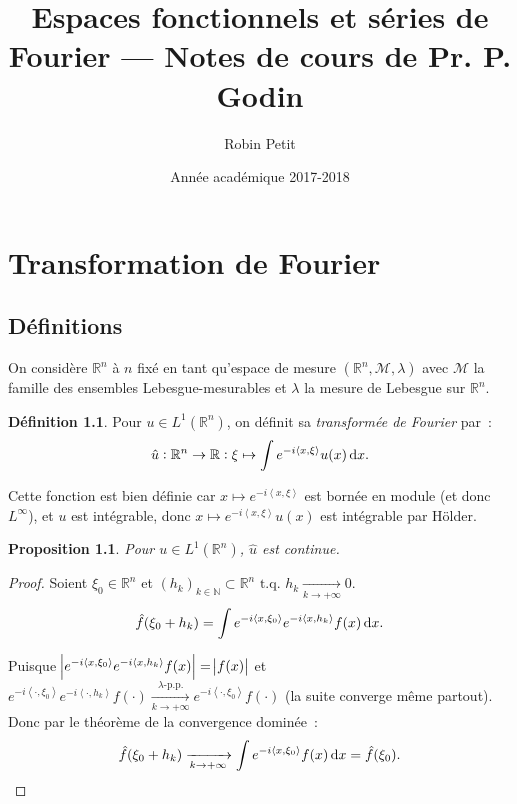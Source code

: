 \documentclass{report}
\title{Espaces fonctionnels et séries de Fourier --- Notes de cours de Pr. P. Godin}
\author{Robin Petit}
\date{Année académique 2017-2018}
\newcommand{\R}{{\mathbb R}}
\newcommand{\N}{{\mathbb N}}
\newcommand{\scpr}[2]{\left\langle#1, #2\right\rangle}
\newcommand{\tq}{\text{ t.q. }}
\newcommand{\pinfty}{{+\infty}}
\newtheorem{prp}[thm]{Proposition}
\theoremstyle{definition}
\newtheorem{déf}[thm]{Définition}
\theoremstyle{remark}
\begin{document}
\maketitle
\tableofcontents
\setcounter{page}{1}

\chapter{Transformation de Fourier}

\section{Définitions}

On considère $\R^n$ à $n$ fixé en tant qu'espace de mesure $(\R^n, \mathcal M, \lambda)$ avec $\mathcal M$ la famille des ensembles Lebesgue-mesurables et $\lambda$
la mesure de Lebesgue sur $\R^n$.

\begin{déf}\label{déf:Fourier dans L^1} Pour $u \in L^1(\R^n)$, on définit sa \textit{transformée de Fourier} par~:
\begin{equation}
	\hat u : \R^n \to \R : \xi \mapsto \int e^{-i\scpr x\xi}u(x)\dif x.
\end{equation}
\end{déf}

Cette fonction est bien définie car $x \mapsto e^{-i\scpr x\xi}$ est bornée en module (et donc $L^\infty$), et $u$ est intégrable, donc $x \mapsto e^{-i\scpr x\xi}u(x)$ est intégrable
par Hölder.

\begin{prp} Pour $u \in L^1(\R^n)$, $\hat u$ est continue.
\end{prp}

\begin{proof} Soient $\xi_0 \in \R^n$ et $(h_k)_{k \in \N} \subset \R^n \tq h_k \xrightarrow[k \to \pinfty]{} 0$.
\[\hat f(\xi_0 + h_k) = \int e^{-i\scpr x{\xi_0}}e^{-i\scpr x{h_k}}f(x)\dif x.\]

Puisque $\abs {e^{-i\scpr x{\xi_0}}e^{-i\scpr x{h_k}}f(x)} = \abs {f(x)}$ et
$e^{-i\scpr \cdot{\xi_0}}e^{-i\scpr \cdot{h_k}}f(\cdot) \xrightarrow[k \to \pinfty]{\lambda\text{-p.p.}}e^{-i\scpr \cdot{\xi_0}}f(\cdot)$ (la suite converge même partout). Donc
par le théorème de la convergence dominée~:
\[\hat f(\xi_0 + h_k) \xrightarrow[k \to \pinfty]{} \int e^{-i\scpr x{\xi_0}}f(x)\dif x = \hat f(\xi_0).\]
\end{proof}
\end{document}
